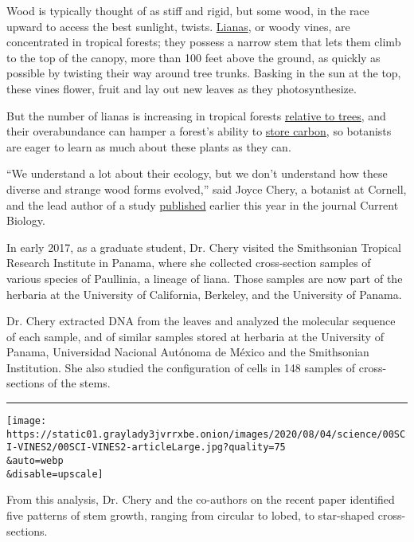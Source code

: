 Wood is typically thought of as stiff and rigid, but some wood, in the
race upward to access the best sunlight, twists.
\href{http://www.lianaecologyproject.com/}{Lianas}, or woody vines, are
concentrated in tropical forests; they possess a narrow stem that lets
them climb to the top of the canopy, more than 100 feet above the
ground, as quickly as possible by twisting their way around tree trunks.
Basking in the sun at the top, these vines flower, fruit and lay out new
leaves as they photosynthesize.

But the number of lianas is increasing in tropical forests
\href{https://www.nytimes3xbfgragh.onion/2011/05/24/science/24vine.html}{relative
to trees}, and their overabundance can hamper a forest's ability to
\href{https://www.nytimes3xbfgragh.onion/2015/10/13/science/study-quantifies-liana-vines-threat-to-forests.html}{store
carbon}, so botanists are eager to learn as much about these plants as
they can.

``We understand a lot about their ecology, but we don't understand how
these diverse and strange wood forms evolved,'' said Joyce Chery, a
botanist at Cornell, and the lead author of a study
\href{https://www.cell.com/current-biology/fulltext/S0960-9822(19)31442-3?_returnURL=https\%3A\%2F\%2Flinkinghub.elsevier.com\%2Fretrieve\%2Fpii\%2FS0960982219314423\%3Fshowall\%3Dtrue}{published}
earlier this year in the journal Current Biology.

In early 2017, as a graduate student, Dr. Chery visited the Smithsonian
Tropical Research Institute in Panama, where she collected cross-section
samples of various species of Paullinia, a lineage of liana. Those
samples are now part of the herbaria at the University of California,
Berkeley, and the University of Panama.

Dr. Chery extracted DNA from the leaves and analyzed the molecular
sequence of each sample, and of similar samples stored at herbaria at
the University of Panama, Universidad Nacional Autónoma de México and
the Smithsonian Institution. She also studied the configuration of cells
in 148 samples of cross-sections of the stems.

\begin{center}\rule{0.5\linewidth}{\linethickness}\end{center}

\texttt{[image: https://static01.graylady3jvrrxbe.onion/images/2020/08/04/science/00SCI-VINES2/00SCI-VINES2-articleLarge.jpg?quality=75\\\&auto=webp\\\&disable=upscale]}

From this analysis, Dr. Chery and the co-authors on the recent paper
identified five patterns of stem growth, ranging from circular to lobed,
to star-shaped cross-sections.

